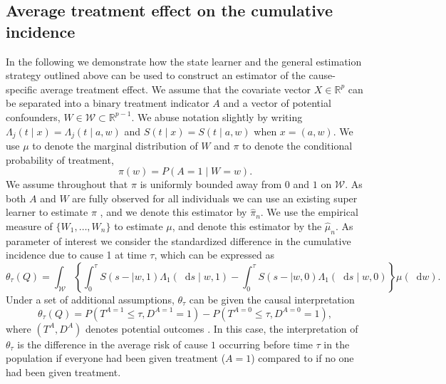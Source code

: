 \documentclass{statsoc}
\numberwithin{theorem}{section}
\newcommand{\R}{\mathbb{R}}
\newcommand*\diff{\mathop{}\!\mathrm{d}}
\newcommand{\1}{\mathds{1}}
\begin{document}
\subsection{Average treatment effect on the cumulative incidence}
\label{sec:cause-spec-aver}

In the following we demonstrate how the state learner and the general estimation
strategy outlined above can be used to construct an estimator of the
cause-specific average treatment effect. We assume that the covariate vector
\( X \in \R^p \) can be separated into a binary treatment indicator \( A \) and
a vector of potential confounders, \( W \in \mathcal{W}\subset \R^{p-1} \). We
abuse notation slightly by writing
\( \Lambda_j(t \mid x) = \Lambda_j(t \mid a, w) \) and
\( S(t \mid x) = S(t \mid a, w) \) when \( x=(a, w) \). We use $\mu$ to denote
the marginal distribution of \( W \) and $\pi$ to denote the conditional
probability of treatment,
\begin{equation*}
  \pi(w) = P(A=1 \mid W=w).
\end{equation*}
We assume throughout that $\pi$ is uniformly bounded away from \( 0 \) and
\( 1 \) on \( \mathcal{W} \). As both \( A \) and \( W \) are fully observed for
all individuals we can use an existing super learner to estimate $\pi$
\citep{Polley_Ledell_Kennedy_Laan_2023_Superlearn}, and we denote this estimator
by $\hat{\pi}_n$. We use the empirical measure of \( \{W_1, \dots, W_n\} \) to
estimate $\mu$, and denote this estimator by the $\hat{\mu}_n$. As parameter of
interest we consider the standardized difference in the cumulative incidence due
to cause 1 at time $\tau$, which can be expressed as
\begin{equation*}
  \theta_{{\tau}}(Q) = \int_{\mathcal{W}} 
  \left\{
    \int_0^{\tau}
    S(s- \mid w, 1)  \Lambda_1(\diff s \mid w, 1)
    -
    \int_0^{\tau}
    S(s- \mid w, 0)  \Lambda_1(\diff s \mid w, 0)
  \right\}
  \mu(\diff w).
\end{equation*}
Under a set of
additional assumptions, \( \theta_{{\tau}} \) can be given the causal
interpretation
\begin{equation*}
  \theta_{{\tau}}(Q) =
  P{(T^{A=1} \leq \tau, D^{A=1}=1)}-
  P{(T^{A=0} \leq \tau, D^{A=0}=1)},
\end{equation*}
where \( (T^A, D^A) \) denotes potential outcomes \citep{hernanRobinsWhatIf}. In
this case, the interpretation of $\theta_{\tau}$ is the difference in the
average risk of cause \( 1 \) occurring before time \( \tau \) in the population
if everyone had been given treatment (\( A=1 \)) compared to if no one had been
given treatment.
\end{document}
